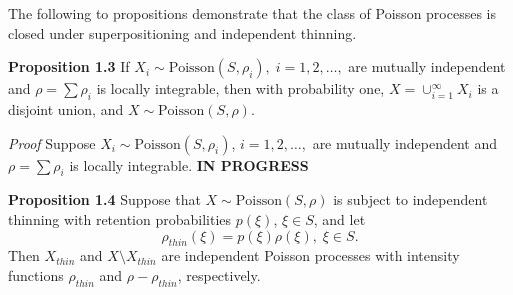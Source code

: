 \documentclass[12pt,twoside]{reedthesis}
\begin{document}
  The following to propositions demonstrate that the class of Poisson
  processes is closed under superpositioning and independent thinning.
  
  \textbf{Proposition 1.3} If
  \(X_i \sim \text{Poisson}(S, \rho_i), \; i = 1, 2, \dots,\) are mutually
  independent and \(\rho = \sum \rho_i\) is locally integrable, then with
  probability one, \(X = \cup_{i = 1}^\infty X_i\) is a disjoint union,
  and \(X\sim \text{Poisson}(S, \rho)\).
  
  \emph{Proof} Suppose \(X_i \sim \text{Poisson}(S, \rho_i)\),
  \(i = 1, 2, \dots,\) are mutually independent and \(\rho = \sum \rho_i\)
  is locally integrable. \textbf{IN PROGRESS}
  
  \textbf{Proposition 1.4} Suppose that \(X\sim \text{Poisson}(S, \rho)\)
  is subject to independent thinning with retention probabilities
  \(p(\xi)\), \(\xi \in S\), and let
  \[\rho_{thin}(\xi) = p(\xi) \rho(\xi), \; \xi \in S.\] Then \(X_{thin}\)
  and \(X\setminus X_{thin}\) are independent Poisson processes with
  intensity functions \(\rho_{thin}\) and \(\rho - \rho_{thin}\),
  respectively.
  
\end{document}
